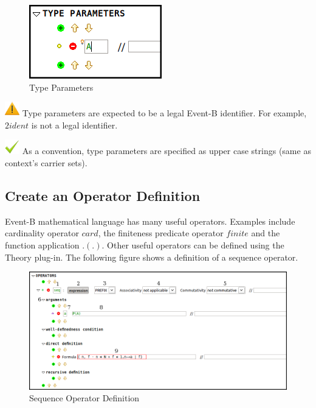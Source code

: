\begin{center}
\begin{figure}
\label{typePar}
\includegraphics{images/TypeParameter.png}
\caption{Type Parameters}
\end{figure}
\end{center}

\includegraphics{images/note.png} Type parameters are expected to be a legal Event-B identifier. For example, $2ident$ is not a legal identifier.

\includegraphics{images/nike.png} As a convention, type parameters are specified as upper case strings (same as context's carrier sets).

\subsection{Create an Operator Definition}
Event-B mathematical language has many useful operators. Examples include cardinality operator $card$, the finiteness predicate operator $finite$ and the function application $.(.)$. Other useful operators can be defined using the Theory plug-in. The following figure shows a definition of a sequence operator.

\begin{center}
\begin{figure}
\label{seqOP}
\includegraphics{images/SeqOperator.png}
\caption{Sequence Operator Definition}
\end{figure}
\end{center}

